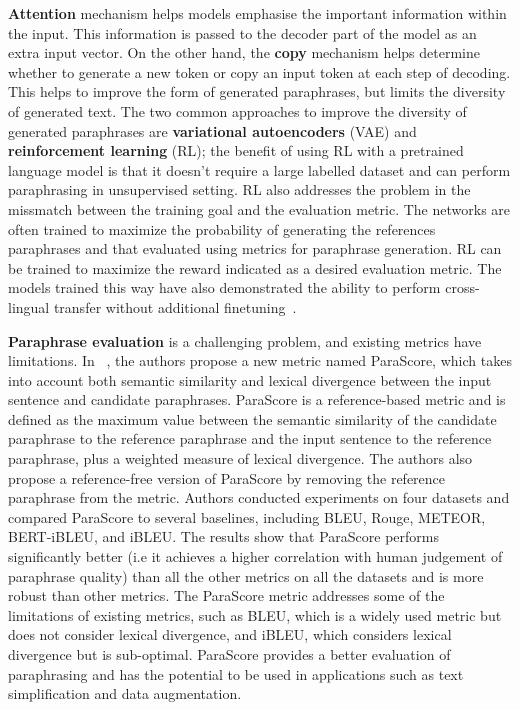 \documentclass[fleqn,moreauthors,10pt]{ds_report}
\begin{document}
\textbf{Attention} mechanism helps models emphasise the important information within the input. This information is passed to the decoder part of the model as an extra input vector. On the other hand, the \textbf{copy} mechanism helps determine whether to generate a new token or copy an input token at each step of decoding. This helps to improve the form of generated paraphrases, but limits the diversity of generated text. The two common approaches to improve the diversity of generated paraphrases are \textbf{variational autoencoders} (VAE) and \textbf{reinforcement learning} (RL); the benefit of using RL with a pretrained language model is that it doesn't require a large labelled dataset and can perform paraphrasing in unsupervised setting. RL also addresses the problem in the missmatch between the training goal and the evaluation metric. The networks are often trained to maximize the probability of generating the references paraphrases and that evaluated using metrics for paraphrase generation. RL can be trained to maximize the reward indicated as a desired evaluation metric. The models trained this way have also demonstrated the ability to perform cross-lingual transfer without additional finetuning~\cite{DBLP:journals/corr/abs-2010-12885}.

\textbf{Paraphrase evaluation} is a challenging problem, and existing metrics have limitations. In ~\cite{evaluation-metrics-in-paraphrase-generation}, the authors propose a new metric named ParaScore, which takes into account both semantic similarity and lexical divergence between the input sentence and candidate paraphrases. ParaScore is a reference-based metric and is defined as the maximum value between the semantic similarity of the candidate paraphrase to the reference paraphrase and the input sentence to the reference paraphrase, plus a weighted measure of lexical divergence. The authors also propose a reference-free version of ParaScore by removing the reference paraphrase from the metric. Authors conducted experiments on four datasets and compared ParaScore to several baselines, including BLEU, Rouge, METEOR, BERT-iBLEU, and iBLEU. The results show that ParaScore performs significantly better (i.e it achieves a higher correlation with human judgement of paraphrase quality) than all the other metrics on all the datasets and is more robust than other metrics. The ParaScore metric addresses some of the limitations of existing metrics, such as BLEU, which is a widely used metric but does not consider lexical divergence, and iBLEU, which considers lexical divergence but is sub-optimal. ParaScore provides a better evaluation of paraphrasing and has the potential to be used in applications such as text simplification and data augmentation.
\end{document}
